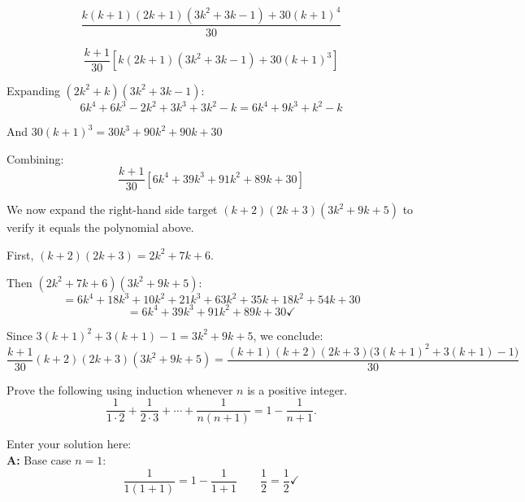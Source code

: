 \documentclass[10pt]{exam}
\begin{document}
\begin{questions}
\begin{solution}
    \[\frac{k(k+1)(2k+1)(3k^2+3k-1) + 30(k+1)^4}{30}\]
    
    \[\frac{k+1}{30}\left[k(2k+1)(3k^2+3k-1) + 30(k+1)^3\right]\]
    
    Expanding $(2k^2+k)(3k^2+3k-1)$:
    \[6k^4 + 6k^3 - 2k^2 + 3k^3 + 3k^2 - k = 6k^4 + 9k^3 + k^2 - k\]
    
    And $30(k+1)^3 = 30k^3 + 90k^2 + 90k + 30$
    
    Combining:
    \[\frac{k+1}{30}\left[6k^4 + 39k^3 + 91k^2 + 89k + 30\right]\]
    
    We now expand the right-hand side target $(k+2)(2k+3)(3k^2+9k+5)$ to verify it equals the polynomial above.
    
    First, $(k+2)(2k+3) = 2k^2 + 7k + 6$.
    
    Then $(2k^2 + 7k + 6)(3k^2 + 9k + 5)$:
    \[= 6k^4 + 18k^3 + 10k^2 + 21k^3 + 63k^2 + 35k + 18k^2 + 54k + 30\]
    \[= 6k^4 + 39k^3 + 91k^2 + 89k + 30 \checkmark\]
    
    Since $3(k+1)^2 + 3(k+1) - 1 = 3k^2 + 9k + 5$, we conclude:
    \[\frac{k+1}{30}(k+2)(2k+3)(3k^2+9k+5)
    = \frac{(k+1)(k+2)(2k+3)\bigl(3(k+1)^2+3(k+1)-1\bigr)}{30}\]
\end{solution}

\question[8] Prove the following using induction whenever \( n \) is a positive integer.  
\[
\frac{1}{1 \cdot 2} + \frac{1}{2 \cdot 3} + \cdots + \frac{1}{n(n+1)} = 1 - \frac{1}{n+1}.
\]

\begin{solution}
    Enter your solution here:\\
    \textbf{A:} Base case $n = 1$:
    \[\frac{1}{1(1+1)} = 1 - \frac{1}{1+1} \qquad \frac{1}{2} = \frac{1}{2} \checkmark\]
    

\end{solution}
\end{questions}
\end{document}
